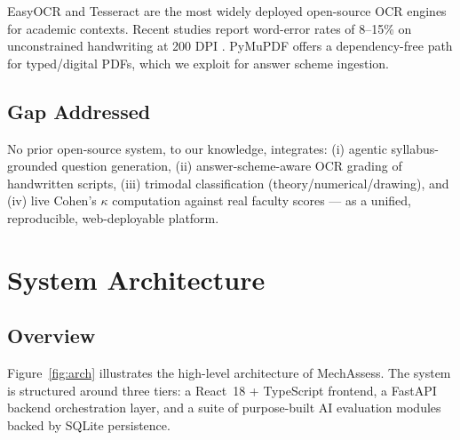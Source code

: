 \documentclass[conference]{IEEEtran}
\begin{document}
EasyOCR \cite{easyocr2020} and Tesseract \cite{smith2007overview} are the most widely deployed open-source OCR engines for academic contexts. Recent studies report word-error rates of 8--15\% on unconstrained handwriting at 200 DPI \cite{bluche2016scan}. PyMuPDF offers a dependency-free path for typed/digital PDFs, which we exploit for answer scheme ingestion.

\subsection{Gap Addressed}

No prior open-source system, to our knowledge, integrates: (i) agentic syllabus-grounded question generation, (ii) answer-scheme-aware OCR grading of handwritten scripts, (iii) trimodal classification (theory/numerical/drawing), and (iv) live Cohen's $\kappa$ computation against real faculty scores — as a unified, reproducible, web-deployable platform.

\section{System Architecture}
\label{sec:arch}

\subsection{Overview}

Figure~\ref{fig:arch} illustrates the high-level architecture of MechAssess. The system is structured around three tiers: a React~18 + TypeScript frontend, a FastAPI backend orchestration layer, and a suite of purpose-built AI evaluation modules backed by SQLite persistence.
\end{document}
